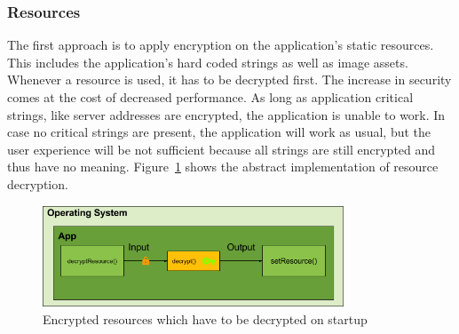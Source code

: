\subsubsection{Resources} \label{subsection:counter-replace-encryption-content-resource}
The first approach is to apply encryption on the application's static resources.
This includes the application's hard coded strings as well as image assets.
Whenever a resource is used, it has to be decrypted first.
The increase in security comes at the cost of decreased performance.
As long as application critical strings, like server addresses are encrypted, the application is unable to work.
In case no critical strings are present, the application will work as usual, but the user experience will be not sufficient because all strings are still encrypted and thus have no meaning.
Figure~\ref{fig:encryptionResource} shows the abstract implementation of resource decryption.
\begin{figure}[h]
    \centering
    \includegraphics[width=0.8\textwidth]{data/encryptionResource.png}
    \caption{Encrypted resources which have to be decrypted on startup}
    \label{fig:encryptionResource}
\end{figure}
